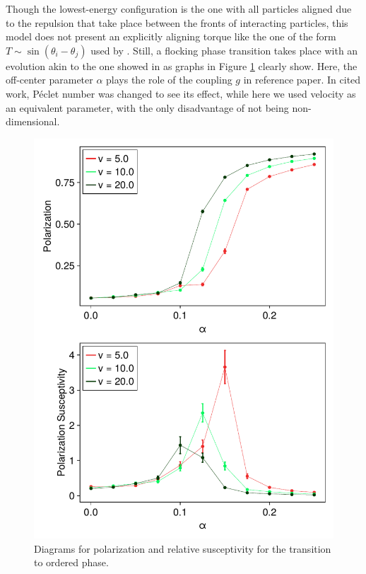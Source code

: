 \documentclass[../../master_thesis_np.tex]{subfiles}
\begin{document}
		Though the lowest-energy configuration is the one with all particles aligned due to the repulsion that take place between the fronts of interacting particles, this model does not present an explicitly aligning torque like the one of the form $T \sim \sin( \theta_{i}-\theta_{j} )$ used by \citeauthor{martin-gomez_collective_2018}.
		Still, a flocking phase transition takes place with an evolution akin to the one showed in \cite{martin-gomez_collective_2018} as graphs in Figure \ref{fig:phasetrans} clearly show.
		Here, the off-center parameter $\alpha$ plays the role of the coupling $g$ in reference paper.
		In cited work, Péclet number was changed to see its effect, while here we used velocity as an equivalent parameter, with the only disadvantage of not being non-dimensional. 
		
		
		\begin{figure}[htp]
			\centering
			\includegraphics[width= \singfigwidth]{phasetrans/pol_susc.pdf}
			\caption{Diagrams for polarization and relative susceptivity for the transition to ordered phase.}
			\label{fig:phasetrans}
		\end{figure}
		
\end{document}
